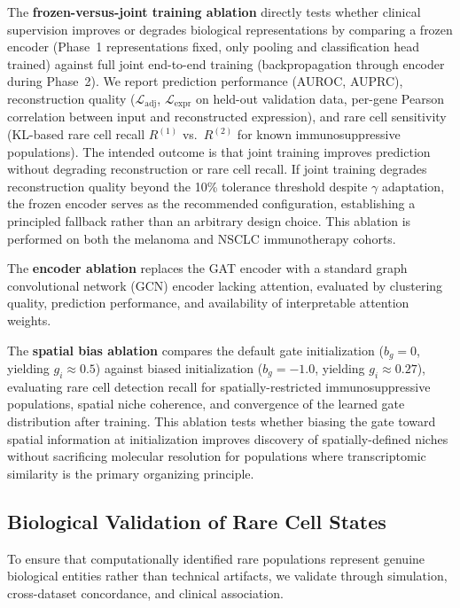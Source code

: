 \documentclass{article}
\begin{document}
The \textbf{frozen-versus-joint training ablation} directly tests whether clinical supervision improves or degrades biological representations by comparing a frozen encoder (Phase~1 representations fixed, only pooling and classification head trained) against full joint end-to-end training (backpropagation through encoder during Phase~2). We report prediction performance (AUROC, AUPRC), reconstruction quality ($\mathcal{L}_{\text{adj}}$, $\mathcal{L}_{\text{expr}}$ on held-out validation data, per-gene Pearson correlation between input and reconstructed expression), and rare cell sensitivity (KL-based rare cell recall $R^{(1)}$ vs.\ $R^{(2)}$ for known immunosuppressive populations). The intended outcome is that joint training improves prediction without degrading reconstruction or rare cell recall. If joint training degrades reconstruction quality beyond the 10\% tolerance threshold despite $\gamma$ adaptation, the frozen encoder serves as the recommended configuration, establishing a principled fallback rather than an arbitrary design choice. This ablation is performed on both the melanoma and NSCLC immunotherapy cohorts.

The \textbf{encoder ablation} replaces the GAT encoder with a standard graph convolutional network (GCN) encoder lacking attention, evaluated by clustering quality, prediction performance, and availability of interpretable attention weights.

The \textbf{spatial bias ablation} compares the default gate initialization ($b_g = 0$, yielding $g_i \approx 0.5$) against biased initialization ($b_g = -1.0$, yielding $g_i \approx 0.27$), evaluating rare cell detection recall for spatially-restricted immunosuppressive populations, spatial niche coherence, and convergence of the learned gate distribution after training. This ablation tests whether biasing the gate toward spatial information at initialization improves discovery of spatially-defined niches without sacrificing molecular resolution for populations where transcriptomic similarity is the primary organizing principle.


\subsection{Biological Validation of Rare Cell States}

To ensure that computationally identified rare populations represent genuine biological entities rather than technical artifacts, we validate through simulation, cross-dataset concordance, and clinical association.
\end{document}
